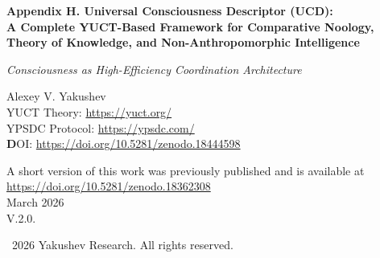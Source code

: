 \documentclass[12pt,a4paper]{article}
\begin{document}
	
	\begin{titlepage}
		\begin{center}
			\vspace*{0cm}
			
			\Huge\textbf{Appendix H. Universal Consciousness Descriptor (UCD):\\ A Complete YUCT-Based Framework for Comparative Noology,\\ Theory of Knowledge, and Non-Anthropomorphic Intelligence}
			
			\vspace{1cm}
			
			\small\textit{Consciousness as High-Efficiency Coordination Architecture}
			
			\vspace{1cm}
			\Large
			Alexey V. Yakushev\\
			
	YUCT Theory: \url{https://yuct.org/}\\
YPSDC Protocol: \url{https://ypsdc.com/}\\


\vspace{2cm}
\textbf DOI: \url{https://doi.org/10.5281/zenodo.18444598}\\

\vspace{1cm}

\vspace{0cm}
\large 
A short version of this work was previously published and is available at\\ \url{https://doi.org/10.5281/zenodo.18362308}\\
\vspace{1cm}
March 2026 \\ \large V.2.0.
			
			\vspace{5cm}
			\textcopyright~2026 Yakushev Research. All rights reserved.
			
			\newpage
			

\end{center}
\end{titlepage}
\end{document}
